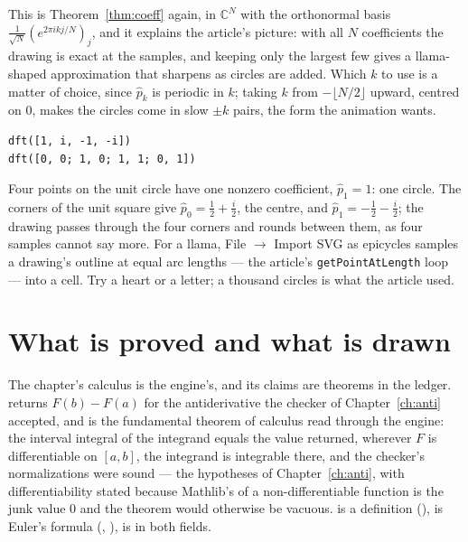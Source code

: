 This is Theorem~\ref{thm:coeff} again, in $\mathbb{C}^N$ with the orthonormal basis $\frac{1}{\sqrt
N}(e^{2\pi i kj/N})_j$, and it explains the article's picture: with all $N$ coefficients the
drawing is exact at the samples, and keeping only the largest few gives a llama-shaped
approximation that sharpens as circles are added. Which $k$ to use is a matter of choice, since
$\hat p_k$ is periodic in $k$; taking $k$ from $-\lfloor N/2\rfloor$ upward, centred on $0$, makes
the circles come in slow $\pm k$ pairs, the form the animation wants.

\begin{trybox}
\begin{verbatim}
dft([1, i, -1, -i])
dft([0, 0; 1, 0; 1, 1; 0, 1])
\end{verbatim}
  Four points on the unit circle have one nonzero coefficient, $\hat p_1 = 1$: one circle. The
  corners of the unit square give $\hat p_0 = \frac{1}{2} + \frac{i}{2}$, the centre, and $\hat
  p_1 = -\frac{1}{2} - \frac{i}{2}$; the drawing passes through the four corners and rounds
  between them, as four samples cannot say more. For a llama, File $\to$ Import SVG as epicycles
  samples a drawing's outline at equal arc lengths --- the article's \texttt{getPointAtLength}
  loop --- into a  cell. Try a heart or a letter; a thousand circles is what the article
  used.
\end{trybox}

\section{What is proved and what is drawn}

The chapter's calculus is the engine's, and its claims are theorems in the ledger.
 returns $F(b) - F(a)$ for the antiderivative the checker of
Chapter~\ref{ch:anti} accepted, and  is the fundamental theorem of calculus
read through the engine: the interval integral of the integrand equals the value returned,
wherever $F$ is differentiable on $[a, b]$, the integrand is integrable there, and the checker's
normalizations were sound --- the hypotheses of Chapter~\ref{ch:anti}, with differentiability
stated because Mathlib's  of a non-differentiable function is the junk value $0$ and the
theorem would otherwise be vacuous.  is a definition (),  is
Euler's formula (, ),  is
 in both fields.

